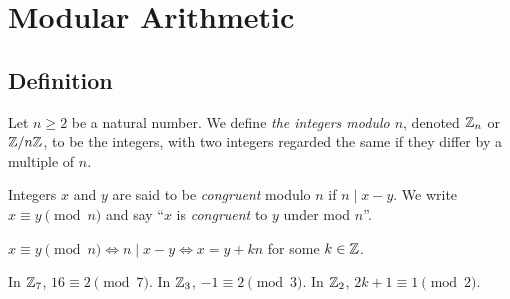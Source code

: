 \documentclass[../main.tex]{subfiles}
\begin{document}
\chapter{Modular Arithmetic}
\section{Definition}
\begin{definition}
Let $n \geq 2$ be a natural number.
We define \textit{the integers modulo $n$}, denoted $\mathbb{Z}_n$ or $\mathbb{Z}/n\mathbb{Z}$, to be the integers, with two integers regarded the same if they differ by a multiple of $n$.
\end{definition}
\begin{definition}[Congruent]
  Integers $x$ and $y$ are said to be \textit{congruent} modulo $n$ if $n \mid x - y$.
  We write $x \equiv y \pmod{n}$ and say ``$x$ is \textit{congruent} to $y$ under mod $n$''.
\end{definition}
\begin{remark}[Note]
  $x \equiv y \pmod{n} \iff n \mid x - y \iff x = y + kn$ for some $k \in \mathbb{Z}$.
\end{remark}
\begin{example}
  In $\mathbb{Z}_7$, $16 \equiv 2 \pmod{7}$.
  In $\mathbb{Z}_3$, $-1 \equiv 2 \pmod{3}$.
  In $\mathbb{Z}_2$, $2k + 1 \equiv 1 \pmod{2}$.
\end{example}
\end{document}
